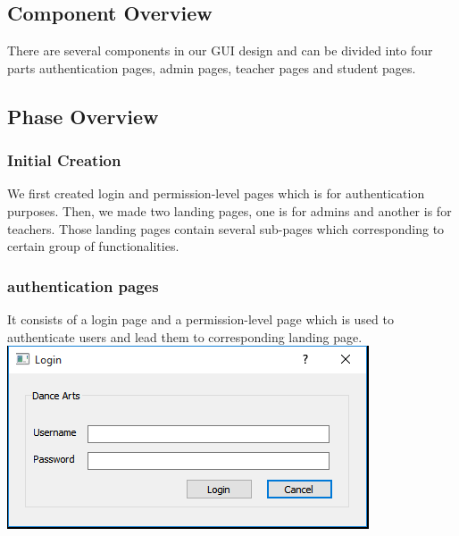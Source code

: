 \subsection{Component  Overview}
There are several components in our GUI design and can be divided into four parts authentication pages, admin pages, teacher pages and student pages.

\subsection{Phase Overview}

\subsubsection{Initial Creation}
We first created login and permission-level pages which is for authentication purposes. Then, we made two landing pages, one is for admins and another is for teachers. Those landing pages contain several sub-pages which corresponding to certain group of functionalities.

\subsubsection{authentication pages}
It consists of a login page and a permission-level page which is used to authenticate users and lead them to corresponding landing page.\\
\includegraphics[scale=0.7]{pics/login_page.png}

